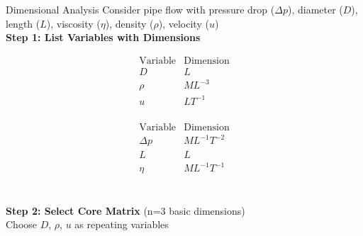\documentclass[10pt]{article}
\begin{document}
\begin{multicols*}{4}
\begin{conceptbox}[r1]{Dimensional Analysis}
	Consider pipe flow with pressure drop ($\Delta p$), diameter ($D$), length ($L$), viscosity ($\eta$), density ($\rho$), velocity ($u$)\\

	\textbf{Step 1: List Variables with Dimensions}\\[-1.25em]
	\begin{minipage}{0.48\textwidth}
		\begin{equation*}
			\begin{array}{c|c}
				\text{Variable} & \text{Dimension} \\
				\hline
				D               & L                \\
				\rho            & ML^{-3}          \\
				u               & LT^{-1}          \\
			\end{array}
		\end{equation*}
	\end{minipage}
	\hfill
	\begin{minipage}{0.48\textwidth}
		\begin{equation*}
			\begin{array}{c|c}
				\text{Variable} & \text{Dimension} \\
				\hline
				\Delta p        & ML^{-1}T^{-2}    \\
				L               & L                \\
				\eta            & ML^{-1}T^{-1}    \\
			\end{array}
		\end{equation*}
	\end{minipage}\\[0.5em]

	\textbf{Step 2: Select Core Matrix} (n=3 basic dimensions)\\
	Choose $D$, $\rho$, $u$ as repeating variables\\


\end{conceptbox}
\end{multicols*}
\end{document}
